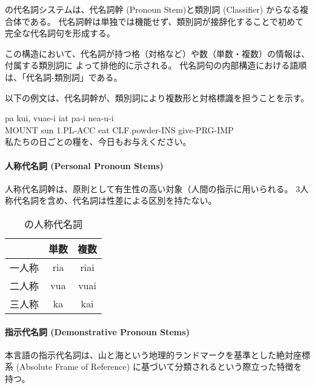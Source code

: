 \langname の代名詞システムは、代名詞幹 (Pronoun Stem)と類別詞 (Classifier) 
からなる複合体である。
代名詞幹は単独では機能せず、類別詞が接辞化することで初めて完全な代名詞句を形成する。

この構造において、代名詞が持つ格（対格など）や数（単数・複数）の情報は、付属する類別詞に
よって排他的に示される。
代名詞句の内部構造における語順は、「代名詞-類別詞」である。

以下の例文は、代名詞幹が、類別詞により複数形と対格標識を担うことを示す。

\begin{exe}
    \ex \gll pa kui, vuae-i iat pa-i nea-u-i \\
        MOUNT sun 1.PL-ACC eat CLF.powder-INS give-PRG-IMP \\
        \glt 私たちの日ごとの糧を、今日もお与えください。
\end{exe}

\paragraph{人称代名詞 (Personal Pronoun Stems)}
人称代名詞幹は、原則として{有生性の高い対象（人間}の指示に用いられる。
3人称代名詞を含め、代名詞は性差による区別を持たない。

\begin{table}[H]
    \centering
    \begin{tabular}{lcc}
        \toprule
        & 単数 & 複数  \\
        \midrule
        一人称 & ria & riai \\
        二人称 & vua & vuai \\
        三人称 & ka & kai \\
        \bottomrule
    \end{tabular}
    \caption{\centering \langname の人称代名詞}
    \label{tab:pronouns}
\end{table}

\paragraph{指示代名詞 (Demonstrative Pronoun Stems)}
本言語の指示代名詞は、{山と海という地理的ランドマークを基準とした絶対座標系
 (Absolute Frame of Reference) に基づいて分類される}という際立った特徴を持つ。

